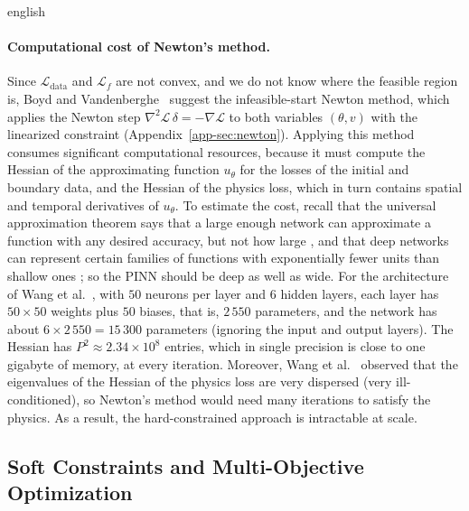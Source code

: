 \documentclass[12pt,letterpaper,twoside]{book}
\newcommand{\Loss}{\mathcal{L}}
\begin{document}
\begin{hyphenrules}{english}
\paragraph{Computational cost of Newton's method.}
Since $\Loss_{\mathrm{data}}$ and $\Loss_f$ are not convex, and we do not know where the feasible region
is, Boyd and Vandenberghe~\cite{boyd2004} suggest the infeasible-start Newton method, which applies the Newton step
$\nabla^2\mathscr{L}\,\delta=-\nabla\mathscr{L}$ to both variables $(\theta,v)$ with the linearized
constraint (Appendix~\ref{app-sec:newton}).
Applying this method consumes significant computational resources, because it must compute the Hessian
of the approximating function $u_\theta$ for the losses of the initial and boundary data, and the
Hessian of the physics loss, which in turn contains spatial and temporal derivatives of $u_\theta$. To
estimate the cost, recall that the universal approximation theorem says that a large enough network
can approximate a function with any desired accuracy, but not how large \cite{lecun2015}, and that
deep networks can represent certain families of functions with exponentially fewer units than shallow
ones \cite{delalleau2011}; so the PINN should be deep as well as wide. For the architecture of
Wang et al.~\cite{wang2021gradient}, with $50$ neurons per layer and $6$ hidden layers, each layer has
$50\times50$ weights plus $50$ biases, that is, $2\,550$ parameters, and the network has about
$6\times2\,550=15\,300$ parameters (ignoring the input and output layers). The Hessian has
$P^2\approx2.34\times10^{8}$ entries, which in single precision is close to one gigabyte of memory, at
every iteration. Moreover, Wang et al.~\cite{wang2021gradient} observed that the eigenvalues of the Hessian of
the physics loss are very dispersed (very ill-conditioned), so Newton's method would need many
iterations to satisfy the physics. As a result, the hard-constrained approach is intractable at scale.

\subsection{Soft Constraints and Multi-Objective Optimization}


\end{hyphenrules}
\end{document}
